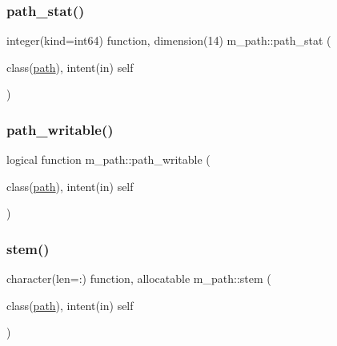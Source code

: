\mbox{\label{namespacem__path_a44b09269412e4291dce9ce87de5f6d8f}} 
\subsubsection{\texorpdfstring{path\+\_\+stat()}{path\_stat()}}
{\footnotesize\ttfamily integer(kind=int64) function, dimension(14) m\+\_\+path\+::path\+\_\+stat (\begin{DoxyParamCaption}\item[{class(\mbox{\hyperlink{structm__path_1_1path}{path}}), intent(in)}]{self }\end{DoxyParamCaption})\hspace{0.3cm}{\ttfamily [private]}}

\mbox{\label{namespacem__path_a27ad0b81b3aedd309035fe3dc4d69128}} 
\subsubsection{\texorpdfstring{path\+\_\+writable()}{path\_writable()}}
{\footnotesize\ttfamily logical function m\+\_\+path\+::path\+\_\+writable (\begin{DoxyParamCaption}\item[{class(\mbox{\hyperlink{structm__path_1_1path}{path}}), intent(in)}]{self }\end{DoxyParamCaption})\hspace{0.3cm}{\ttfamily [private]}}

\mbox{\label{namespacem__path_ac0be359b3514ee777302195a99e583c7}} 
\subsubsection{\texorpdfstring{stem()}{stem()}}
{\footnotesize\ttfamily character(len=\+:) function, allocatable m\+\_\+path\+::stem (\begin{DoxyParamCaption}\item[{class(\mbox{\hyperlink{structm__path_1_1path}{path}}), intent(in)}]{self }\end{DoxyParamCaption})}

